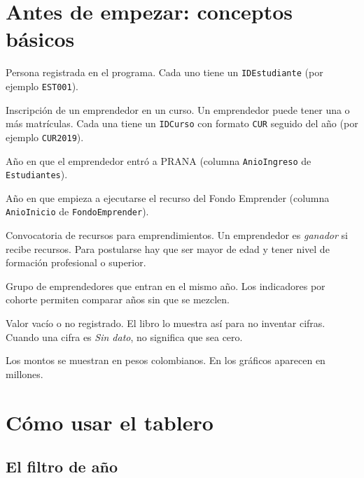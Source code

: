 \documentclass[11pt,a4paper]{article}
\begin{document}
\section{Antes de empezar: conceptos básicos}

\begin{description}[leftmargin=3.2cm,style=nextline]
  \item[Emprendedor] Persona registrada en el programa. Cada uno tiene un \texttt{IDEstudiante} (por ejemplo \texttt{EST001}).
  \item[Matrícula] Inscripción de un emprendedor en un curso. Un emprendedor puede tener una o más matrículas. Cada una tiene un \texttt{IDCurso} con formato \texttt{CUR} seguido del año (por ejemplo \texttt{CUR2019}).
  \item[Año de ingreso] Año en que el emprendedor entró a PRANA (columna \texttt{AnioIngreso} de \texttt{Estudiantes}).
  \item[Año de inicio del Fondo] Año en que empieza a ejecutarse el recurso del Fondo Emprender (columna \texttt{AnioInicio} de \texttt{FondoEmprender}).
  \item[Fondo Emprender] Convocatoria de recursos para emprendimientos. Un emprendedor es \emph{ganador} si recibe recursos. Para postularse hay que ser mayor de edad y tener nivel de formación profesional o superior.
  \item[Cohorte] Grupo de emprendedores que entran en el mismo año. Los indicadores por cohorte permiten comparar años sin que se mezclen.
  \item[Sin dato] Valor vacío o no registrado. El libro lo muestra así para no inventar cifras. Cuando una cifra es \emph{Sin dato}, no significa que sea cero.
  \item[Pesos y millones] Los montos se muestran en pesos colombianos. En los gráficos aparecen en millones.
\end{description}

\section{Cómo usar el tablero}

\subsection{El filtro de año}
\end{document}
